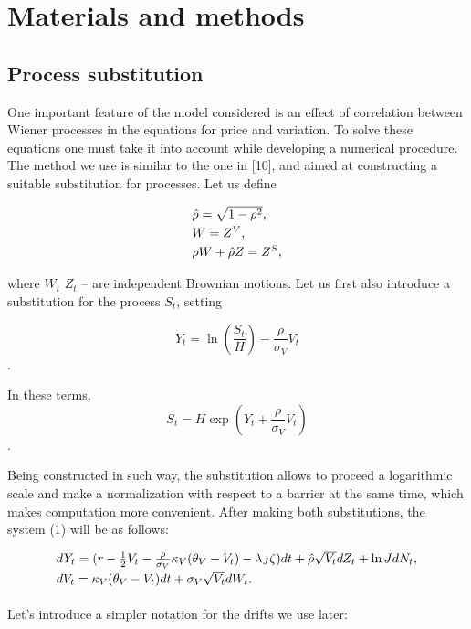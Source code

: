 \documentclass[a4paper]{jpconf}
\begin{document}
\section{Materials and methods}

\subsection{Process substitution}

One important feature of the model considered is an effect of correlation between Wiener processes in the equations for price and variation. To solve these equations one must take it into account while developing a numerical procedure. The method we use is similar to the one in [10], and aimed at constructing a suitable substitution for processes. Let us define 

\begin{equation*}
\begin{array}{l}
	\hat{\rho} = \sqrt{1-\rho^2},
	\smallskip\\
	W = Z^V,
	\smallskip\\
	\rho W + \hat{\rho}Z = Z^S,
\end{array} 
\end{equation*}

where $W_t$ $Z_t$ -- are independent Brownian motions. Let us first also introduce a substitution for the process $S_t$, setting 

$$Y_t = \ln(\frac{S_t}{H}) - \frac{\rho}{\sigma_V}V_t$$. 

In these terms, $$S_t = H\exp(Y_t + \frac{\rho}{\sigma_V}V_t) $$. 

Being constructed in such way, the substitution allows to proceed a logarithmic scale and  make a normalization with respect to a barrier at the same time, which makes computation more convenient.
After making both substitutions, the system (1) will be as follows:

\begin{equation*}
\begin{array}{l}
d Y_t = (r-\frac{1}{2}V_t - \frac{\rho}{\sigma_V}\kappa_V(\theta_V - V_t) - \lambda_J \zeta)dt+\hat{\rho}\sqrt{V_t} dZ_t+\ln JdN_t,
\smallskip\\
dV_t= \kappa_V(\theta_V-V_t)dt+\sigma_V\sqrt{V_t}dW_t.
\smallskip\\
\end{array}
\end{equation*}

Let's introduce a simpler notation for the drifts we use later:
\end{document}
